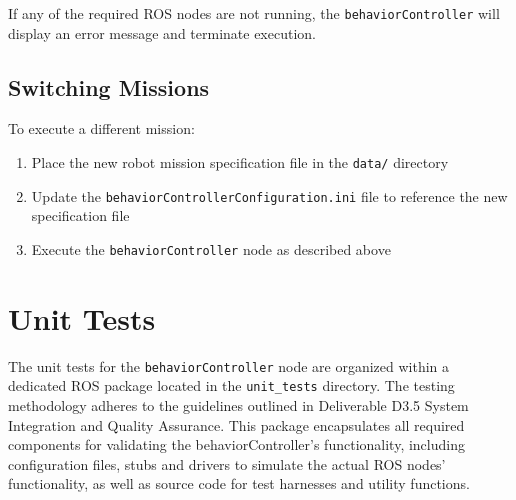 \documentclass{CSSRforAfrica}
\begin{document}
If any of the required ROS nodes are not running, the \texttt{\small behaviorController} will display an error message and terminate execution.
\subsection{Switching Missions}
To execute a different mission:
\begin{enumerate}
\item Place the new robot mission specification file in the \texttt{\small data/} directory
\item Update the \texttt{\small behaviorControllerConfiguration.ini} file to reference the new specification file
\item Execute the \texttt{\small behaviorController} node as described above
\end{enumerate}

\newpage

\section{Unit Tests}
The unit tests for the \texttt{\small behaviorController} node are organized within a dedicated ROS package located in the \texttt{\small unit\_tests} directory. The testing methodology adheres to the guidelines outlined in Deliverable \textnormal{D3.5 System Integration and Quality Assurance}. This package encapsulates all required components for validating the behaviorController’s functionality, including configuration files, stubs and drivers to simulate the actual ROS nodes' functionality, as well as source code for test harnesses and utility functions.
\end{document}
